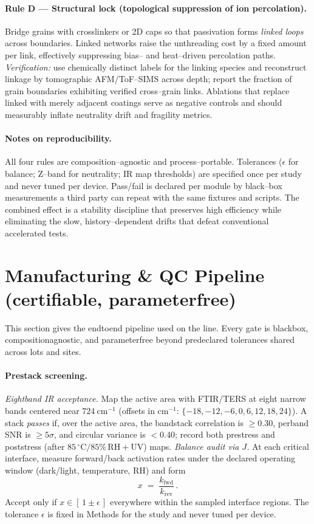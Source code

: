 \documentclass[12pt]{article}
\begin{document}
\paragraph{Rule D — Structural lock (topological suppression of ion percolation).}
Bridge grains with crosslinkers or 2D caps so that passivation forms \emph{linked loops} across boundaries. Linked networks raise the unthreading cost by a fixed amount per link, effectively suppressing bias– and heat–driven percolation paths. \emph{Verification:} use chemically distinct labels for the linking species and reconstruct linkage by tomographic AFM/ToF–SIMS across depth; report the fraction of grain boundaries exhibiting verified cross–grain links. Ablations that replace linked with merely adjacent coatings serve as negative controls and should measurably inflate neutrality drift and fragility metrics.

\paragraph{Notes on reproducibility.}
All four rules are composition–agnostic and process–portable. Tolerances ($\epsilon$ for balance; Z–band for neutrality; IR map thresholds) are specified once per study and never tuned per device. Pass/fail is declared per module by black–box measurements a third party can repeat with the same fixtures and scripts. The combined effect is a stability discipline that preserves high efficiency while eliminating the slow, history–dependent drifts that defeat conventional accelerated tests.

\section{Manufacturing \& QC Pipeline (certifiable, parameter\textendash free)}

This section gives the end\textendash to\textendash end pipeline used on the line. Every gate is black\textendash box, composition\textendash agnostic, and parameter\textendash free beyond predeclared tolerances shared across lots and sites.

\paragraph{Pre\textendash stack screening.}
\emph{Eight\textendash band IR acceptance.} Map the active area with FTIR/TERS at eight narrow bands centered near $724~\mathrm{cm}^{-1}$ (offsets in $\mathrm{cm}^{-1}$: $\{-18,-12,-6,0,6,12,18,24\}$). A stack \emph{passes} if, over the active area, the band\textendash stack correlation is $\ge 0.30$, per\textendash band SNR is $\ge 5\sigma$, and circular variance is $<0.40$; record both pre\textendash stress and post\textendash stress (after $85\,^{\circ}\mathrm{C}/85\%\,\mathrm{RH}+\mathrm{UV}$) maps. \emph{Balance audit via $J$.} At each critical interface, measure forward/back activation rates under the declared operating window (dark/light, temperature, RH) and form
\[
x \;=\; \frac{k_{\mathrm{fwd}}}{k_{\mathrm{rev}}}\,.
\]
Accept only if $x\in[\,1\pm\epsilon\,]$ everywhere within the sampled interface regions. The tolerance $\epsilon$ is fixed in Methods for the study and never tuned per device.
\end{document}
